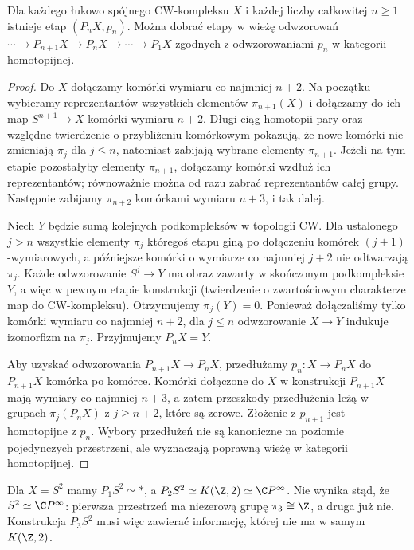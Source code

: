 \begin{twierdzenie}
\label{thm:postnikow-istence-v7}
Dla każdego łukowo spójnego CW-kompleksu $X$ i każdej
liczby całkowitej $n\ge1$ istnieje etap $(P_nX,p_n)$.
Można dobrać etapy w wieżę odwzorowań
$\cdots\to P_{n+1}X\to P_nX\to\cdots\to P_1X$
zgodnych z odwzorowaniami $p_n$ w kategorii homotopijnej.
\end{twierdzenie}
\begin{proof}
Do $X$ dołączamy komórki wymiaru co najmniej $n+2$.
Na początku wybieramy reprezentantów wszystkich elementów
$\pi_{n+1}(X)$ i dołączamy do ich map
$S^{n+1}\to X$ komórki wymiaru $n+2$.
Długi ciąg homotopii pary oraz względne twierdzenie
o przybliżeniu komórkowym pokazują, że nowe komórki
nie zmieniają $\pi_j$ dla $j\le n$, natomiast zabijają
wybrane elementy $\pi_{n+1}$. Jeżeli na tym etapie
pozostałyby elementy $\pi_{n+1}$, dołączamy komórki
wzdłuż ich reprezentantów; równoważnie można od razu
zabrać reprezentantów całej grupy. Następnie zabijamy
$\pi_{n+2}$ komórkami wymiaru $n+3$, i tak dalej.

Niech $Y$ będzie sumą kolejnych podkompleksów w topologii
CW. Dla ustalonego $j>n$ wszystkie elementy $\pi_j$
któregoś etapu giną po dołączeniu komórek $(j+1)$-wymiarowych,
a późniejsze komórki o wymiarze co najmniej $j+2$
nie odtwarzają $\pi_j$. Każde odwzorowanie $S^j\to Y$ ma obraz zawarty w skończonym
podkompleksie $Y$, a więc w pewnym etapie konstrukcji (twierdzenie
o zwartościowym charakterze map do CW-kompleksu).
Otrzymujemy $\pi_j(Y)=0$. Ponieważ dołączaliśmy tylko
komórki wymiaru co najmniej $n+2$, dla $j\le n$
odwzorowanie $X\to Y$ indukuje izomorfizm na $\pi_j$.
Przyjmujemy $P_nX=Y$.

Aby uzyskać odwzorowania $P_{n+1}X\to P_nX$, przedłużamy
$p_n:X\to P_nX$ do $P_{n+1}X$ komórka po komórce.
Komórki dołączone do $X$ w konstrukcji $P_{n+1}X$
mają wymiary co najmniej $n+3$, a zatem przeszkody
przedłużenia leżą w grupach $\pi_j(P_nX)$ z $j\ge n+2$,
które są zerowe. Złożenie z $p_{n+1}$ jest homotopijne
z $p_n$. Wybory przedłużeń nie są kanoniczne na poziomie
pojedynczych przestrzeni, ale wyznaczają poprawną wieżę
w kategorii homotopijnej.
\end{proof}

\begin{przyklad}
Dla $X=S^2$ mamy $P_1S^2\simeq *$, a
$P_2S^2\simeq K(\Z,2)\simeq\C P^\infty$.
Nie wynika stąd, że $S^2\simeq\C P^\infty$:
pierwsza przestrzeń ma niezerową grupę $\pi_3\cong\Z$,
a druga już nie. Konstrukcja $P_3S^2$ musi więc
zawierać informację, której nie ma w samym $K(\Z,2)$.
\end{przyklad}


